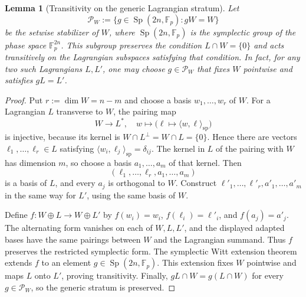 \documentclass[11pt]{article}
\newcommand{\F}{\mathbb F}
\newcommand{\1}{\mathbf 1}
\newcommand{\spair}[2]{\langle #1,#2\rangle_{\mathrm{sp}}}
\theoremstyle{plain}
\newtheorem{lemma}[theorem]{Lemma}
\theoremstyle{definition}
\theoremstyle{remark}
\begin{document}
\begin{lemma}[Transitivity on the generic Lagrangian stratum]
\label{lem:fixed-W-generic-lagrangian-transitivity}
Let
\begin{equation}
 \mathcal P_W:=\{g\in\operatorname{Sp}(2n,\F_p):gW=W\}
 \label{eq:fixed-W-parabolic-subgroup}
\end{equation}
be the setwise stabilizer of $W$, where $\operatorname{Sp}(2n,\F_p)$ is the
symplectic group of the phase space $\F_p^{2n}$.  This subgroup preserves the condition
$L\cap W=\{0\}$ and acts transitively on the Lagrangian subspaces satisfying
that condition.  In fact, for any two such Lagrangians $L,L'$, one may choose
$g\in\mathcal P_W$ that fixes $W$ pointwise and satisfies $gL=L'$.
\end{lemma}
\begin{proof}
Put $r:=\dim W=n-m$ and choose a basis $w_1,\ldots,w_r$ of $W$.  For a
Lagrangian $L$ transverse to $W$, the pairing map
\begin{equation}
 W\longrightarrow L^*,\quad
 w\longmapsto\bigl(\ell\mapsto\spair{w}{\ell}\bigr)
 \label{eq:fixed-W-pairing-injection}
\end{equation}
is injective, because its kernel is $W\cap L^\perp=W\cap L=\{0\}$.  Hence
there are vectors $\ell_1,\ldots,\ell_r\in L$ satisfying
$\spair{w_i}{\ell_j}=\delta_{ij}$.  The kernel in $L$ of the pairing with $W$
has dimension $m$, so choose a basis $a_1,\ldots,a_m$ of that kernel.  Then
\begin{equation}
 (\ell_1,\ldots,\ell_r,a_1,\ldots,a_m)
 \label{eq:fixed-W-adapted-L-basis}
\end{equation}
is a basis of $L$, and every $a_j$ is orthogonal to $W$.  Construct
$\ell'_1,\ldots,\ell'_r,a'_1,\ldots,a'_m$ in the same way for $L'$, using
the same basis of $W$.

Define $f:W\oplus L\to W\oplus L'$ by
$f(w_i)=w_i$, $f(\ell_i)=\ell'_i$, and $f(a_j)=a'_j$.  The alternating form
vanishes on each of $W,L,L'$, and the displayed adapted bases have the same
pairings between $W$ and the Lagrangian summand.  Thus $f$ preserves the
restricted symplectic form.  The symplectic Witt extension theorem extends
$f$ to an element $g\in\operatorname{Sp}(2n,\F_p)$.  This extension fixes
$W$ pointwise and maps $L$ onto $L'$, proving transitivity.  Finally,
$gL\cap W=g(L\cap W)$ for every $g\in\mathcal P_W$, so the generic stratum is
preserved.
\end{proof}
\end{document}
